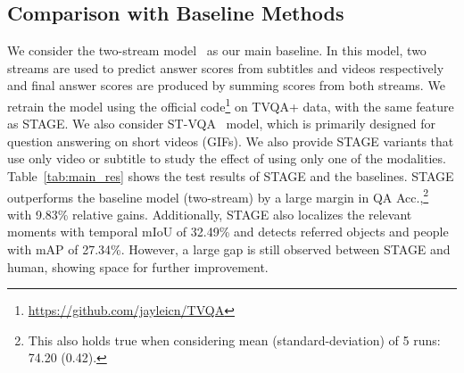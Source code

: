 \documentclass[11pt,a4paper]{article}
\begin{document}
\subsection{Comparison with Baseline Methods}
We consider the two-stream model~\cite{lei2018tvqa} as our main baseline. 
In this model, two streams are used to predict answer scores from subtitles and videos respectively and final answer scores are produced by summing scores from both streams. 
We retrain the model using the official code\footnote{\url{https://github.com/jayleicn/TVQA}} on TVQA+ data, with the same feature as STAGE. 
We also consider ST-VQA~\cite{Jang2017TGIFQATS} model, which is primarily designed for question answering on short videos (GIFs).
We also provide STAGE variants that use only video or subtitle to study the effect of using only one of the modalities.
Table~\ref{tab:main_res} shows the test results of STAGE and the baselines. STAGE outperforms the baseline model (two-stream) by a large margin in QA Acc.,\footnote{This also holds true when considering mean (standard-deviation) of 5 runs: 74.20 (0.42).} with 9.83\% relative gains.
Additionally, STAGE also localizes the relevant moments with temporal mIoU of 32.49\% and detects referred objects and people with mAP of 27.34\%. 
However, a large gap is still observed between STAGE and human, showing space for further improvement.



\begin{table}[!t]
\centering
\small
{}
\caption{Ablation study of STAGE on TVQA+ val set. \textit{Each row adds an extra component to the row above it.}}
\label{tab:ablation}
\end{table}
\end{document}
